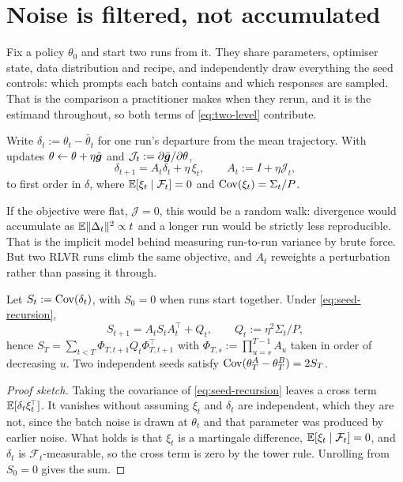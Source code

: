 \section{Noise is filtered, not accumulated}
\label{sec:theory}

Fix a policy $\theta_0$ and start two runs from it. They share parameters, optimiser state, data
distribution and recipe, and independently draw everything the seed controls: which prompts each
batch contains and which responses are sampled. That is the comparison a practitioner makes when
they rerun, and it is the estimand throughout, so both terms of \eqref{eq:two-level} contribute.

Write $\delta_t := \theta_t - \bar\theta_t$ for one run's departure from the mean trajectory. With
updates $\theta \leftarrow \theta + \eta\hat{\bm{g}}$ and
$\mathcal{J}_t := \partial\bar{\bm{g}}/\partial\theta$,
\begin{equation}
  \label{eq:seed-recursion}
  \delta_{t+1} = A_t \delta_t + \eta\,\xi_t,
  \qquad A_t := I + \eta \mathcal{J}_t,
\end{equation}
to first order in $\delta$, where $\mathbb{E}[\xi_t \mid \mathcal{F}_t] = 0$ and
$\operatorname{Cov}(\xi_t) = \Sigma_t/P$.

If the objective were flat, $\mathcal{J} = 0$, this would be a random walk: divergence would
accumulate as $\mathbb{E}\|\Delta_t\|^2 \propto t$ and a longer run would be strictly less reproducible.
That is the implicit model behind measuring run-to-run variance by brute force. But two RLVR runs
climb the same objective, and $A_t$ reweights a perturbation rather than passing it through.

\begin{theorem}
  \label{thm:propagation}
  Let $S_t := \operatorname{Cov}(\delta_t)$, with $S_0 = 0$ when runs start together. Under
  \eqref{eq:seed-recursion},
  \begin{equation}
    \label{eq:lyapunov}
    S_{t+1} = A_t S_t A_t^{\!\top} + Q_t,
    \qquad Q_t := \eta^2 \Sigma_t / P,
  \end{equation}
  hence $S_T = \sum_{t<T} \Phi_{T,t+1} Q_t \Phi_{T,t+1}^{\!\top}$ with
  $\Phi_{T,s} := \prod_{u=s}^{T-1} A_u$ taken in order of decreasing $u$. Two independent seeds
  satisfy $\operatorname{Cov}(\theta^A_T - \theta^B_T) = 2S_T$.
\end{theorem}

\begin{proof}[Proof sketch]
  Taking the covariance of \eqref{eq:seed-recursion} leaves a cross term
  $\mathbb{E}[\delta_t \xi_t^{\!\top}]$. It vanishes without assuming $\xi_t$ and $\delta_t$ are
  independent, which they are not, since the batch noise is drawn at $\theta_t$ and that parameter
  was produced by earlier noise. What holds is that $\xi_t$ is a martingale difference,
  $\mathbb{E}[\xi_t \mid \mathcal{F}_t] = 0$, and $\delta_t$ is $\mathcal{F}_t$-measurable, so the cross
  term is zero by the tower rule. Unrolling from $S_0 = 0$ gives the sum.
\end{proof}

